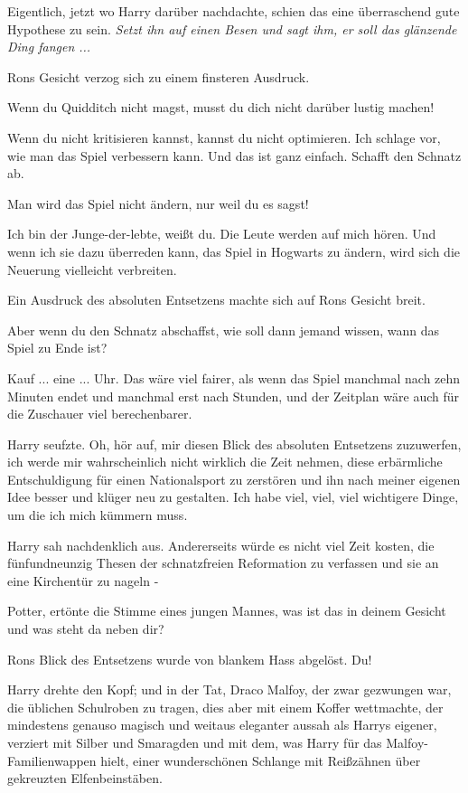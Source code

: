 Eigentlich, jetzt wo Harry darüber nachdachte, schien das eine überraschend gute
Hypothese zu sein. \emph{Setzt ihn auf einen Besen und sagt ihm, er soll das
glänzende Ding fangen ...}

Rons Gesicht verzog sich zu einem finsteren Ausdruck.

\glqq{}Wenn du Quidditch nicht magst, musst du dich nicht darüber lustig
machen!\grqq{}

\glqq{}Wenn du nicht kritisieren kannst, kannst du nicht optimieren. Ich schlage
vor, wie man das Spiel verbessern kann. Und das ist ganz einfach. Schafft den
Schnatz ab.\grqq{}

\glqq{}Man wird das Spiel nicht ändern, nur weil du es sagst!\grqq{}

\glqq{}Ich bin der Junge-der-lebte, weißt du. Die Leute werden auf mich hören.
Und wenn ich sie dazu überreden kann, das Spiel in Hogwarts zu ändern, wird sich
die Neuerung vielleicht verbreiten.\grqq{}

Ein Ausdruck des absoluten Entsetzens machte sich auf Rons Gesicht breit.

\glqq{}Aber wenn du den Schnatz abschaffst, wie soll dann jemand wissen, wann
das Spiel zu Ende ist?\grqq{}

\glqq{}Kauf ... eine ... Uhr. Das wäre viel fairer, als wenn das Spiel manchmal
nach zehn Minuten endet und manchmal erst nach Stunden, und der Zeitplan wäre
auch für die Zuschauer viel berechenbarer.\grqq{}

Harry seufzte. \glqq{}Oh, hör auf, mir diesen Blick des absoluten Entsetzens
zuzuwerfen, ich werde mir wahrscheinlich nicht wirklich die Zeit nehmen, diese
erbärmliche Entschuldigung für einen Nationalsport zu zerstören und ihn nach
meiner eigenen Idee besser und klüger neu zu gestalten. Ich habe viel, viel,
viel wichtigere Dinge, um die ich mich kümmern muss.\grqq{}

Harry sah nachdenklich aus. \glqq{}Andererseits würde es nicht viel Zeit kosten,
die fünfundneunzig Thesen der schnatzfreien Reformation zu verfassen und sie an
eine Kirchentür zu nageln -\grqq{}

\glqq{}Potter\grqq{}, ertönte die Stimme eines jungen Mannes, \glqq{}was ist das
in deinem Gesicht und was steht da neben dir?\grqq{}

Rons Blick des Entsetzens wurde von blankem Hass abgelöst. \glqq{}Du!\grqq{}

Harry drehte den Kopf; und in der Tat, Draco Malfoy, der zwar gezwungen war, die
üblichen Schulroben zu tragen, dies aber mit einem Koffer wettmachte, der
mindestens genauso magisch und weitaus eleganter aussah als Harrys eigener,
verziert mit Silber und Smaragden und mit dem, was Harry für das
Malfoy-Familienwappen hielt, einer wunderschönen Schlange mit Reißzähnen über
gekreuzten Elfenbeinstäben.

